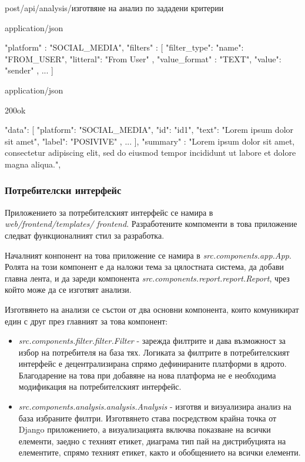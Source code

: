 \documentclass{article}
\begin{document}
\begin{apiRoute}{post}{/api/analysis/}{изготвяне на анализ по зададени критерии}
  \begin{routeRequest}{application/json}
\begin{routeRequestBody}
{
  "platform" : "SOCIAL_MEDIA",
  "filters" : [
    {
      "filter_type": {
        "name": "FROM_USER",
        "litteral": "From User"
      },
      "value_format" : "TEXT",
      "value": "sender"
    },
    ...
  ]
}
\end{routeRequestBody}
  \end{routeRequest}
  \begin{routeResponse}{application/json}
    \begin{routeResponseItem}{200}{ok}
\begin{routeResponseItemBody}
{
  "data": [
    {
      "platform": "SOCIAL_MEDIA",
      "id": "id1",
      "text": "Lorem ipsum dolor sit amet",
      "label": "POSIVIVE"
    },
    ...
  ],
  "summary" : "Lorem ipsum dolor sit amet, consectetur adipiscing elit, sed do eiusmod tempor incididunt ut labore et dolore magna aliqua.",
}
\end{routeResponseItemBody}
    \end{routeResponseItem}
  \end{routeResponse}
\end{apiRoute}

\subsubsection{Потребителски интерфейс}

Приложението за потребителският интерфейс се намира в \textit{web/frontend/templates/ frontend}. Разработените
компоменти в това приложение следват функционалният стил за разработка.

Началният конпонент на това приложение се намира в \textit{src.components.app.App}. Ролята на този компонент е да
наложи тема за цялостната система, да добави главна лента, и да зареди компонента
\textit{src.components.report.report.Report}, чрез който може да се изготвят анализи.

Изготвянето на анализи се състои от два основни компонента, които комуникират един с друг през главният за това
компонент:

\begin{itemize}
  \item \textit{src.components.filter.filter.Filter} - зарежда филтрите и дава възможност за избор на потребителя на
  база тях. Логиката за филтрите в потребителският интерфейс е децентрализирана спрямо дефинираните платформи в ядрото.
  Благодарение на това при добавяне на нова платформа не е необходима модификация на потребителският интерфейс.
  \item \textit{src.components.analysis.analysis.Analysis} - изготвя и визуализира анализ на база избраните филтри.
  Изготвянето става посредством крайна точка от Django приложението, а визуализацията включва показване на всички
  елементи, заедно с техният етикет, диаграма тип пай на дистрибуцията на елементите, спрямо техният етикет, както и
  обобщението на всички елементи.
\end{itemize}
\end{document}
